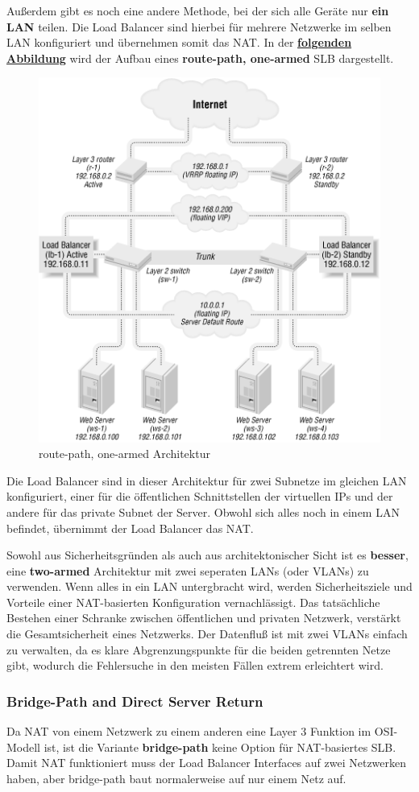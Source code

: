 Außerdem gibt es noch eine andere Methode, bei der sich alle Geräte nur \textbf{ein LAN} teilen. Die Load Balancer sind hierbei für mehrere Netzwerke im selben LAN konfiguriert und übernehmen somit das NAT. In der \textbf{\hyperref[nat_slb_02]{folgenden Abbildung}} wird der Aufbau eines \textbf{route-path, one-armed} SLB dargestellt.
\begin{figure}[!h]
	\begin{center}
		\includegraphics[width=0.5\linewidth]{images/slb_0702}
		\caption{route-path, one-armed Architektur}
		\label{nat_slb_02}
	\end{center}
\end{figure}

Die Load Balancer sind in dieser Architektur für zwei Subnetze im gleichen LAN konfiguriert, einer für die öffentlichen Schnittstellen der virtuellen IPs und der andere für das private Subnet der Server. Obwohl sich alles noch in einem LAN befindet, übernimmt der Load Balancer das NAT.

Sowohl aus Sicherheitsgründen als auch aus architektonischer Sicht ist es \textbf{besser}, eine \textbf{two-armed} Architektur mit zwei seperaten LANs (oder VLANs) zu verwenden. Wenn alles in ein LAN untergbracht wird, werden Sicherheitsziele und Vorteile einer NAT-basierten Konfiguration vernachlässigt. Das tatsächliche Bestehen einer Schranke zwischen öffentlichen und privaten Netzwerk, verstärkt die Gesamtsicherheit eines Netzwerks. Der Datenfluß ist mit zwei VLANs einfach zu verwalten, da es klare Abgrenzungspunkte für die beiden getrennten Netze gibt, wodurch die Fehlersuche in den meisten Fällen extrem erleichtert wird.
\newpage

\subsubsection{Bridge-Path and Direct Server Return}
Da NAT von einem Netzwerk zu einem anderen eine Layer 3 Funktion im  OSI-Modell ist, ist die Variante \textbf{bridge-path} keine Option für NAT-basiertes SLB. Damit NAT funktioniert muss der Load Balancer Interfaces auf zwei Netzwerken haben, aber bridge-path baut normalerweise auf nur einem Netz auf.

